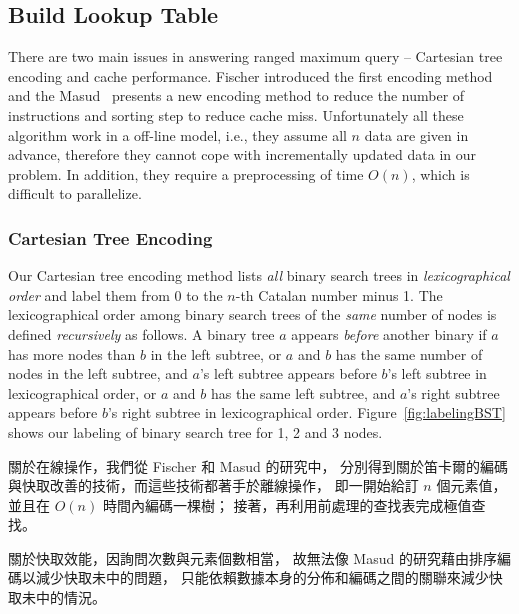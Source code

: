 %

\subsection{Build Lookup Table}

There are two main issues in answering ranged maximum query --
Cartesian tree encoding and cache performance.  Fischer introduced the
first encoding method and the Masud~\cite{Hasan2010CacheOA} presents a
new encoding method to reduce the number of instructions and sorting
step to reduce cache miss.  Unfortunately all these algorithm work in
a off-line model, i.e., they assume all $n$ data are given in advance,
therefore they cannot cope with incrementally updated data in our
problem.  In addition, they require a preprocessing of time $O(n)$,
which is difficult to parallelize.


\subsubsection{Cartesian Tree Encoding}

Our Cartesian tree encoding method lists {\em all} binary search trees
in {\em lexicographical order} and label them from $0$ to the $n$-th
Catalan number minus 1.  The lexicographical order among binary search
trees of the {\em same} number of nodes is defined {\em recursively}
as follows.  A binary tree $a$ appears {\em before} another binary if
$a$ has more nodes than $b$ in the left subtree, or $a$ and $b$ has
the same number of nodes in the left subtree, and $a$'s left subtree
appears before $b$'s left subtree in lexicographical order, or $a$ and
$b$ has the same left subtree, and $a$'s right subtree appears before
$b$'s right subtree in lexicographical order.
Figure~\ref{fig:labelingBST} shows our labeling of binary search tree
for 1, 2 and 3 nodes.

\iffalse
關於在線操作，我們從 Fischer \cite{fischer} 和 Masud \cite{masud} 的研究中，
分別得到關於笛卡爾的編碼與快取改善的技術，而這些技術都著手於離線操作，
即一開始給訂 $n$ 個元素值，並且在 $O(n)$ 時間內編碼一棵樹；
接著，再利用前處理的查找表完成極值查找。

關於快取效能，因詢問次數與元素個數相當，
故無法像 Masud \cite{masud} 的研究藉由排序編碼以減少快取未中的問題，
只能依賴數據本身的分佈和編碼之間的關聯來減少快取未中的情況。

